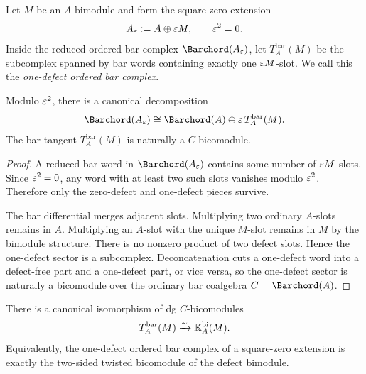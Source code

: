 \begin{definition}
Let $M$ be an $A$-bimodule and form the square-zero extension
\[
A_\varepsilon:=A\oplus \varepsilon M,\qquad \varepsilon^2=0.
\]
Inside the reduced ordered bar complex $\Barchord(A_\eps)$, let $T_A^{\mathrm{bar}}(M)$ be the
subcomplex spanned by bar words containing exactly one $\varepsilon M$-slot.
We call this the \emph{one-defect ordered bar complex}.
\end{definition}

\begin{proposition}
\ClaimStatusProvedHere
\label{prop:one-defect}
Modulo $\varepsilon^2$, there is a canonical decomposition
\[
\Barchord(A_\eps)\cong \Barchord(A)\oplus \eps\, T_A^{\mathrm{bar}}(M).
\]
The bar tangent $T_A^{\mathrm{bar}}(M)$ is naturally a $C$-bicomodule.
\end{proposition}

\begin{proof}
A reduced bar word in $\Barchord(A_\eps)$ contains some number of $\varepsilon M$-slots.
Since $\varepsilon^2=0$, any word with at least two such slots vanishes modulo $\varepsilon^2$.
Therefore only the zero-defect and one-defect pieces survive.

The bar differential merges adjacent slots. Multiplying two ordinary $A$-slots remains in $A$.
Multiplying an $A$-slot with the unique $M$-slot remains in $M$ by the bimodule structure.
There is no nonzero product of two defect slots. Hence the one-defect sector is a subcomplex.
Deconcatenation cuts a one-defect word into a defect-free part and a one-defect part, or vice versa,
so the one-defect sector is naturally a bicomodule over the ordinary bar coalgebra $C=\Barchord(A)$.
\end{proof}

\begin{theorem}
\ClaimStatusProvedHere
\label{thm:tangent=K}
There is a canonical isomorphism of dg $C$-bicomodules
\[
T_A^{\mathrm{bar}}(M)\xrightarrow{\sim}\mathbb{K}_A^{\mathrm{bi}}(M).
\]
Equivalently, the one-defect ordered bar complex of a square-zero extension is exactly the two-sided
twisted bicomodule of the defect bimodule.
\end{theorem}

